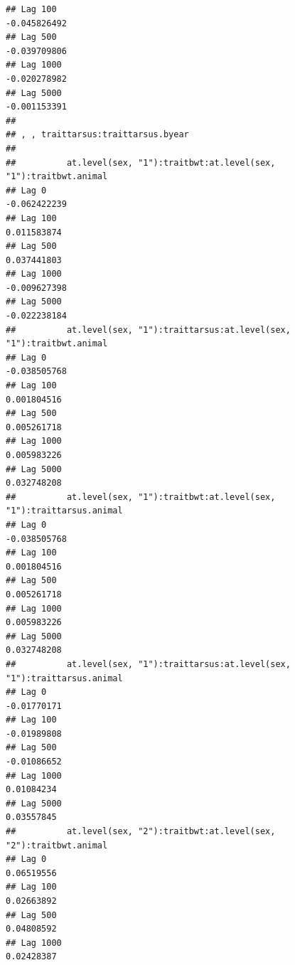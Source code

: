\documentclass[
  12pt,
]{book}
\begin{document}
\begin{verbatim}
## Lag 100                                                         -0.045826492
## Lag 500                                                         -0.039709806
## Lag 1000                                                        -0.020278982
## Lag 5000                                                        -0.001153391
## 
## , , traittarsus:traittarsus.byear
## 
##          at.level(sex, "1"):traitbwt:at.level(sex, "1"):traitbwt.animal
## Lag 0                                                      -0.062422239
## Lag 100                                                     0.011583874
## Lag 500                                                     0.037441803
## Lag 1000                                                   -0.009627398
## Lag 5000                                                   -0.022238184
##          at.level(sex, "1"):traittarsus:at.level(sex, "1"):traitbwt.animal
## Lag 0                                                         -0.038505768
## Lag 100                                                        0.001804516
## Lag 500                                                        0.005261718
## Lag 1000                                                       0.005983226
## Lag 5000                                                       0.032748208
##          at.level(sex, "1"):traitbwt:at.level(sex, "1"):traittarsus.animal
## Lag 0                                                         -0.038505768
## Lag 100                                                        0.001804516
## Lag 500                                                        0.005261718
## Lag 1000                                                       0.005983226
## Lag 5000                                                       0.032748208
##          at.level(sex, "1"):traittarsus:at.level(sex, "1"):traittarsus.animal
## Lag 0                                                             -0.01770171
## Lag 100                                                           -0.01989808
## Lag 500                                                           -0.01086652
## Lag 1000                                                           0.01084234
## Lag 5000                                                           0.03557845
##          at.level(sex, "2"):traitbwt:at.level(sex, "2"):traitbwt.animal
## Lag 0                                                        0.06519556
## Lag 100                                                      0.02663892
## Lag 500                                                      0.04808592
## Lag 1000                                                     0.02428387

\end{verbatim}
\end{document}
